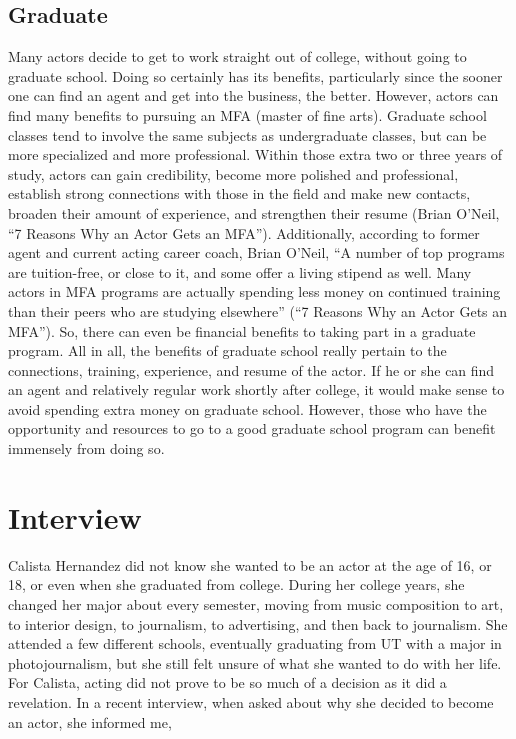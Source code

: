 \begin{multicols}{2}
	\subsection{Graduate}
		Many actors decide to get to work straight out of college, without going to graduate school. Doing so certainly has its benefits, particularly since the sooner one can find an agent and get into the business, the better. However, actors can find many benefits to pursuing an MFA (master of fine arts). Graduate school classes tend to involve the same subjects as undergraduate classes, but can be more specialized and more professional. Within those extra two or three years of study, actors can gain credibility, become more polished and professional, establish strong connections with those in the field and make new contacts, broaden their amount of experience, and strengthen their resume (Brian O’Neil, “7 Reasons Why an Actor Gets an MFA”). Additionally, according to former agent and current acting career coach, Brian O’Neil, “A number of top programs are tuition-free, or close to it, and some offer a living stipend as well. Many actors in MFA programs are actually spending less money on continued training than their peers who are studying elsewhere” (“7 Reasons Why an Actor Gets an MFA”). So, there can even be financial benefits to taking part in a graduate program. All in all, the benefits of graduate school really pertain to the connections, training, experience, and resume of the actor. If he or she can find an agent and relatively regular work shortly after college, it would make sense to avoid spending extra money on graduate school. However, those who have the opportunity and resources to go to a good graduate school program can benefit immensely from doing so. 

\section{Interview}
	Calista Hernandez did not know she wanted to be an actor at the age of 16, or 18, or even when she graduated from college. During her college years, she changed her major about every semester, moving from music composition to art, to interior design, to journalism, to advertising, and then back to journalism. She attended a few different schools, eventually graduating from UT with a major in photojournalism, but she still felt unsure of what she wanted to do with her life. For Calista, acting did not prove to be so much of a decision as it did a revelation. In a recent interview, when asked about why she decided to become an actor, she informed me,  


\end{multicols}
